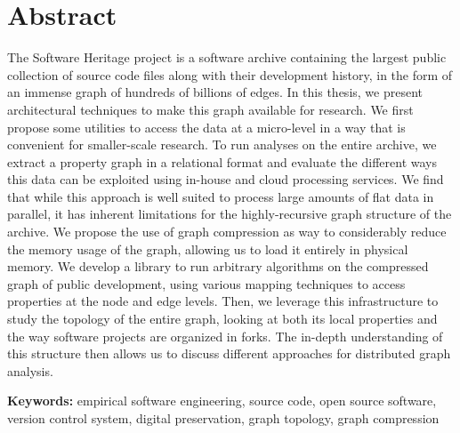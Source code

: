 \section*{Abstract}
\begin{SingleSpace}
    The Software Heritage project is a software archive containing the largest
    public collection of source code files along with their development history,
    in the form of an immense graph of hundreds of billions of edges. In this
    thesis, we present architectural techniques to make this graph available
    for research. We first propose some utilities to access the data at a
    micro-level in a way that is convenient for smaller-scale research.
    To run analyses on the entire archive, we extract a property graph in a
    relational format and evaluate the different ways this data can be
    exploited using in-house and cloud processing services.
    We find that while this approach is well suited to process large amounts of
    flat data in parallel, it has inherent limitations for the highly-recursive
    graph structure of the archive. We propose the use of graph compression as
    way to considerably reduce the memory usage of the graph, allowing us to
    load it entirely in physical memory. We develop a library to run arbitrary
    algorithms on the compressed graph of public development, using various
    mapping techniques to access properties at the node and edge levels.
    Then, we leverage this infrastructure to study the topology of the entire
    graph, looking at both its local properties and the way software projects
    are organized in forks. The in-depth understanding of this structure then
    allows us to discuss different approaches for distributed graph analysis.

\medskip

\textbf{Keywords:} empirical software engineering, source code, open source
software, version control system, digital preservation, graph topology, graph
compression

\end{SingleSpace}



